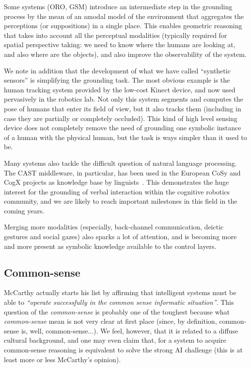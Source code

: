 \documentclass[a4paper, twocolumn]{article}
\begin{document}
Some systems (ORO, GSM) introduce an intermediate step in the grounding process
by the mean of an amodal model of the environment that aggregates the
perceptions (or suppositions) in a single place. This enables geometric
reasoning that takes into account all the perceptual modalities (typically
required for spatial perspective taking: we need to know where the humans are
looking at, and also where are the objects), and also improve the observability
of the system.

We note in addition that the development of what we have called ``synthetic
sensors'' is simplifying the grounding task. The most obvious example is the
human tracking system provided by the low-cost Kinect device, and now used
pervasively in the robotics lab. Not only this system segments and computes the
pose of humans that enter its field of view, but it also tracks them (including
in case they are partially or completely occluded). This kind of high level
sensing device does not completely remove the need of grounding one symbolic
instance of a human with the physical human, but the task is ways simpler than
it used to be.

Many systems also tackle the difficult question of natural language processing.
The CAST middleware, in particular, has been used in the European CoSy and CogX
projects as knowledge base by linguists~\cite{Kruijff2010a}. This demonstrates
the huge interest for the grounding of verbal interaction within the cognitive
robotics community, and we are likely to reach important milestones in this
field in the coming years.

Merging more modalities (especially, back-channel communication, deictic
gestures and social gazes) also sparks a lot of attention, and is becoming more
and more present as symbolic knowledge available to the control layers.

\subsection{Common-sense}

McCarthy actually starts his list by affirming that intelligent systems must be
able to \emph{``operate successfully in the common sense informatic
situation''}. This question of the \emph{common-sense} is probably one of the
toughest because what \emph{common-sense} mean is not very clear at first place
(since, by definition, common-sense is, well, common-sense...). We feel,
however, that it is related to a diffuse cultural background, and one may even
claim that, for a system to acquire common-sense reasoning is equivalent to
solve the strong AI challenge (this is at least more or less McCarthy's opinion).
\end{document}
